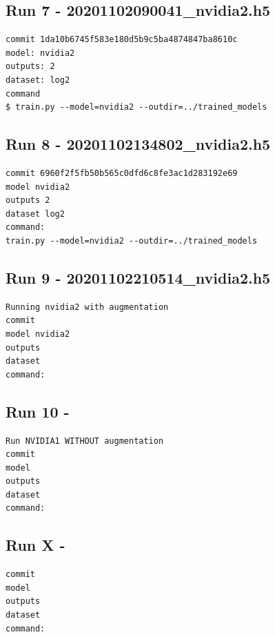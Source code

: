 \subsection{Run 7 - 20201102090041_nvidia2.h5}
\begin{verbatim}
commit 1da10b6745f583e180d5b9c5ba4874847ba8610c
model: nvidia2
outputs: 2
dataset: log2
command
$ train.py --model=nvidia2 --outdir=../trained_models
\end{verbatim}

\subsection{Run 8 - 20201102134802_nvidia2.h5}
\begin{verbatim}
commit 6960f2f5fb50b565c0dfd6c8fe3ac1d283192e69
model nvidia2
outputs 2
dataset log2
command:
train.py --model=nvidia2 --outdir=../trained_models
\end{verbatim}


\subsection{Run 9 - 20201102210514_nvidia2.h5}
\begin{verbatim}
Running nvidia2 with augmentation
commit 
model nvidia2
outputs
dataset
command:
\end{verbatim}

\subsection{Run 10 - }
\begin{verbatim}
Run NVIDIA1 WITHOUT augmentation
commit 
model
outputs
dataset
command:
\end{verbatim}

\subsection{Run X - }
\begin{verbatim}
commit 
model
outputs
dataset
command:
\end{verbatim}





